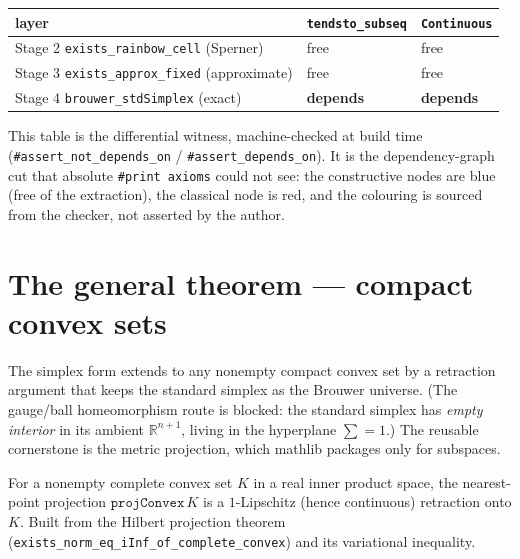 \begin{center}
\begin{tabular}{lll}
\textbf{layer} & \texttt{tendsto\_subseq} & \texttt{Continuous} \\
\hline
Stage 2 \texttt{exists\_rainbow\_cell} (Sperner)      & free        & free \\
Stage 3 \texttt{exists\_approx\_fixed} (approximate)  & free        & free \\
Stage 4 \texttt{brouwer\_stdSimplex} (exact)          & \textbf{depends} & \textbf{depends} \\
\end{tabular}
\end{center}

This table is the differential witness, machine-checked at build time
(\texttt{\#assert\_not\_depends\_on} / \texttt{\#assert\_depends\_on}).  It is the
dependency-graph cut that absolute \texttt{\#print axioms} could not see: the
constructive nodes are blue (free of the extraction), the classical node is red, and
the colouring is sourced from the checker, not asserted by the author.

\section{The general theorem — compact convex sets}
\label{sec:brouwer_convex}

The simplex form extends to any nonempty compact convex set by a retraction argument that keeps the
standard simplex as the Brouwer universe. (The gauge/ball homeomorphism route is blocked: the
standard simplex has \emph{empty interior} in its ambient $\mathbb{R}^{n+1}$, living in the
hyperplane $\sum = 1$.) The reusable cornerstone is the metric projection, which mathlib packages
only for subspaces.

\begin{theorem}
\label{thm:brouwer_proj}
\leanok
For a nonempty complete convex set $K$ in a real inner product space, the nearest-point projection
$\texttt{projConvex}\,K$ is a $1$-Lipschitz (hence continuous) retraction onto $K$. Built from the
Hilbert projection theorem (\texttt{exists\_norm\_eq\_iInf\_of\_complete\_convex}) and its
variational inequality.
\end{theorem}

